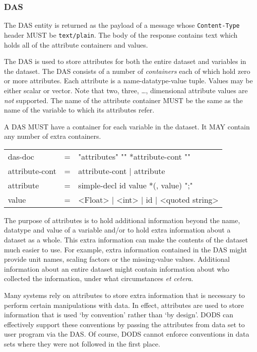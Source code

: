 \documentclass{article}
\begin{document}
\subsubsection{DAS}
\label{sec:das}
The \ac{DAS} entity is returned as the payload of a message whose
\texttt{Content-Type} header MUST be \texttt{text/plain}. The body of the
response contains text which holds all of the attribute containers and
values.

The \ac{DAS} is used to store attributes for both the entire dataset and
variables in the dataset. The \ac{DAS} consists of a number of
\emph{containers} each of which hold zero or more attributes. Each attribute
is a name-datatype-value tuple. Values may be either scalar or vector. Note
that two, three, \ldots, dimensional attribute values are \emph{not}
supported.  The name of the attribute container MUST be the same as
the name of the variable to which its attributes refer.

A \ac{DAS} MUST have a container for each variable in the dataset. It MAY
contain any number of extra containers.

\begin{ttfamily}
\begin{center}
\begin{tabular}{lll}
das-doc & = & "attributes" "{" *attribute-cont "}" \\
attribute-cont & = & attribute-cont | attribute \\
attribute & = & simple-decl id value *(, value) ";" \\
value & = & <Float> | <int> | id | <quoted string> \\
\end{tabular}
\end{center}
\end{ttfamily}

The purpose of attributes is to hold additional information beyond the name,
datatype and value of a variable and/or to hold extra information about a
dataset as a whole. This extra information can make the contents of the
dataset much easier to use. For example, extra information contained in the
\ac{DAS} might provide unit names, scaling factors or the missing-value
values. Additional information about an entire dataset might contain
information about who collected the information, under what circumstances
\emph{et cetera}. 

Many systems rely on attributes to store extra information that is necessary
to perform certain manipulations with data. In effect, attributes are used to
store information that is used `by convention' rather than `by design'.
\ac{DODS} can effectively support these conventions by passing the attributes
from data set to user program via the \ac{DAS}. Of course, \ac{DODS} cannot
enforce conventions in data sets where they were not followed in the first
place.
\end{document}
